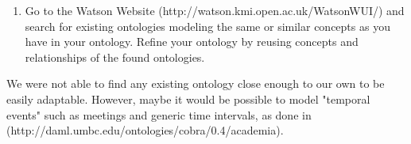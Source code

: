 \documentclass[10pt,a4paper]{article}
\begin{document}
\begin{enumerate}
\begin{enumerate}
\item Go to the Watson Website (http://watson.kmi.open.ac.uk/WatsonWUI/) and
search for existing ontologies modeling the same or similar concepts as you have
in your ontology. Refine your ontology by reusing concepts and relationships of
the found ontologies.
\end{enumerate}

We were not able to find any existing ontology close enough to our own to be easily adaptable. However, maybe it would be possible to model "temporal events" such as meetings and generic time intervals, as done in (http://daml.umbc.edu/ontologies/cobra/0.4/academia).
\end{enumerate}
\end{document}
